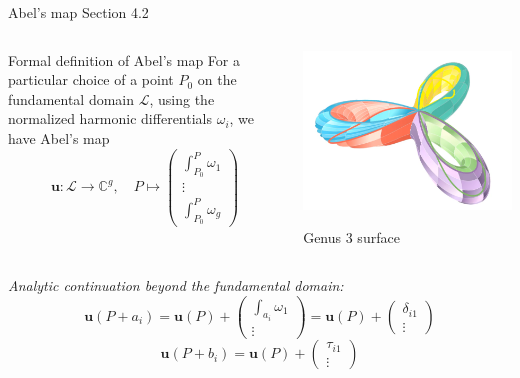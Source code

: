 \documentclass[11pt,aspectratio=169]{beamer}
\begin{document}
\begin{frame}{Abel's map}{\tiny \cite{Ber06} Section 4.2}
    \begin{columns}
        \begin{column}{0.55\textwidth}
            \begin{block}{Formal definition of Abel's map}
                For a particular choice of a point $P_0$ on the fundamental domain $\mathcal L$, using the normalized harmonic differentials $\omega_i$, we have Abel's map
                \[
                    \mathbf{u} : \mathcal L \rightarrow \mathbb{C}^g ,
                    \quad P \mapsto \begin{pmatrix} \int_{P_0}^P \omega_1 \\ \vdots \\ \int_{P_0}^P \omega_g \end{pmatrix}
                \]
            \end{block}
        \end{column}
        \begin{column}{0.45\textwidth}
            \center

            \includegraphics[width=0.7\columnwidth]{assets/Genus3Surface.png}

            \tiny Genus 3 surface
        \end{column}
    \end{columns}

    \emph{Analytic continuation beyond the fundamental domain:}
    \[\mathbf{u}(P+a_i) = \mathbf{u}(P) + \begin{pmatrix} \int_{a_i} \omega_1 \\ \vdots \end{pmatrix} = \mathbf{u}(P) + \begin{pmatrix} \delta_{i1} \\ \vdots \end{pmatrix}\]
    \[\mathbf{u}(P+b_i) = \mathbf{u}(P) + \begin{pmatrix} \tau_{i1} \\ \vdots \end{pmatrix}\]
\end{frame}
\end{document}

